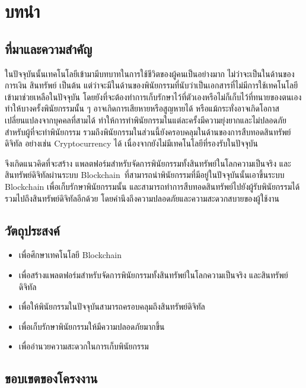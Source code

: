 \documentclass[12pt,oneside,openright,a4paper]{cpe-thai-project}
\begin{document}
\chapter{บทนำ}

\section{ที่มาและความสำคัญ}

\tab ในปัจจุบันนั้นเทคโนโลยีเข้ามามีบทบาทในการใช้ชีวิตของผู้คนเป็นอย่างมาก ไม่ว่าจะเป็นในด้านของ การเงิน สินทรัพย์ เป็นต้น แต่ว่าจะมีในด้านของพินัยกรรมที่นับว่าเป็นเอกสารที่ไม่มีการใช้เทคโนโลยีเข้ามาช่วยเหลือในปัจจุบัน โดยยังที่จะต้องทำการเก็บรักษาไว้ที่ตัวเองหรือไม่ก็เก็บไว้ที่ทนายของตนเองทำให้บางครั้งพินัยกรรมนั้น ๆ อาจเกิดการเสียหายหรือสูญหายได้ หรือแม้กระทั่งอาจเกิดโอกาสเปลี่ยนแปลงจากบุคคลที่สามได้ ทำให้การทำพินัยกรรมในแต่ละครั้งมีความยุ่งยากและไม่ปลอดภัยสำหรับผู้ที่จะทำพินัยกรรม รวมถึงพินัยกรรมในส่วนนี้ยังครอบคลุมในด้านของการสืบทอดสินทรัพย์ดิจิทัล อย่างเช่น Cryptocurrency ได้ เนื่องจากยังไม่มีเทคโนโลยีที่รองรับในปัจจุบัน

\tab จึงเกิดแนวคิดที่จะสร้าง แพลตฟอร์มสำหรับจัดการพินัยกรรมทั้งสินทรัพย์ในโลกความเป็นจริง และสินทรัพย์ดิจิทัลผ่านระบบ Blockchain\ ที่สามารถนำพินัยกรรมที่มีอยู่ในปัจจุบันนั้นเอาขึ้นระบบ Blockchain เพื่อเก็บรักษาพินัยกรรมนั้น และสามารถทำการสืบทอดสินทรัพย์ไปยังผู้รับพินัยกรรมได้ รวมไปถึงสินทรัพย์ดิจิทัลอีกด้วย โดยคำนึงถึงความปลอดภัยและความสะดวกสบายของผู้ใช้งาน


\section{วัตถุประสงค์}

\begin{itemize}
\item เพื่อศึกษาเทคโนโลยี Blockchain
\item เพื่อสร้างแพลตฟอร์มสำหรับจัดการพินัยกรรมทั้งสินทรัพย์ในโลกความเป็นจริง และสินทรัพย์ดิจิทัล
\item เพื่อให้พินัยกรรมในปัจจุบันสามารถครอบคลุมถึงสินทรัพย์ดิจิทัล
\item เพื่อเก็บรักษาพินัยกรรมให้มีความปลอดภัยมากขึ้น
\item เพื่ออำนวยความสะดวกในการเก็บพินัยกรรม
\end{itemize}

\section{ขอบเขตของโครงงาน}
\end{document}
